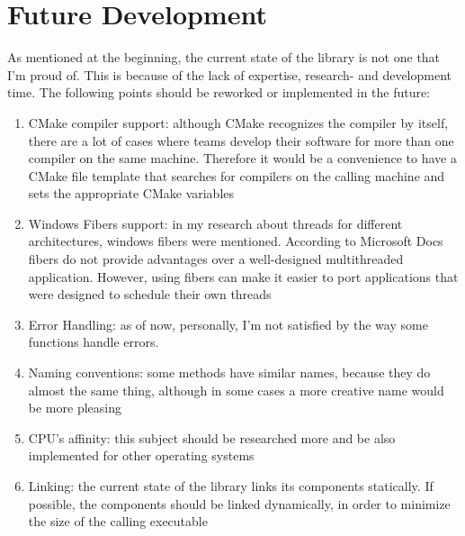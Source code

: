\chapter{Future Development}
As mentioned at the beginning, the current state of the library is not one that I'm proud of. This is because of the lack of expertise, research- and development time. The following points should be reworked or implemented in the future:
\begin{enumerate}
	\item CMake compiler support: although CMake recognizes the compiler by itself, there are a lot of cases where teams develop their software for more than one compiler on the same machine. Therefore it would be a convenience to have a CMake file template that searches for compilers on the calling machine and sets the appropriate CMake variables
	\item Windows Fibers support: in my research about threads for different architectures, windows fibers were mentioned. According to Microsoft Docs \dq fibers do not provide advantages over a well-designed multithreaded application. However, using fibers can make it easier to port applications that were designed to schedule their own threads\dq{}\cite{windows-fibers-doc}
	\item Error Handling: as of now, personally, I'm not satisfied by the way some functions handle errors. 
	\item Naming conventions: some methods have similar names, because they do almost the same thing, although in some cases a more creative name would be more pleasing
	\item CPU's affinity: this subject should be researched more and be also implemented for other operating systems
	\item Linking: the current state of the library links its components statically. If possible, the components should be linked dynamically, in order to minimize the size of the calling executable	
\end{enumerate}